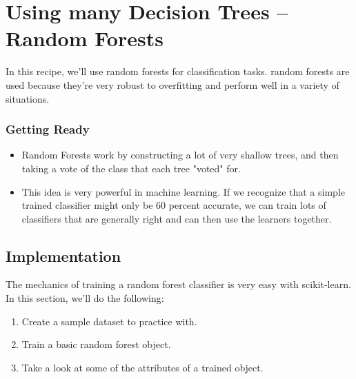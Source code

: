\documentclass[SKL-MASTER.tex]{subfiles}
\begin{document}
	\Large
\section*{Using many Decision Trees – Random Forests}
In this recipe, we'll use random forests for classification tasks. random forests are used because
they're very robust to overfitting and perform well in a variety of situations.
\subsubsection*{Getting Ready}
\begin{itemize}
\item Random Forests
work by constructing a lot of very shallow trees, and then taking a vote of the class that
each tree "voted" for. 
\item This idea is very powerful in machine learning. If we recognize that
a simple trained classifier might only be 60 percent accurate, we can train lots of classifiers
that are generally right and can then use the learners together.
\end{itemize}


\subsection*{Implementation}
The mechanics of training a random forest classifier is very easy with scikit-learn. In this section,
we'll do the following:
\begin{enumerate}
\item Create a sample dataset to practice with.
\item Train a basic random forest object.
\item Take a look at some of the attributes of a trained object.
\end{enumerate}
\end{document}
